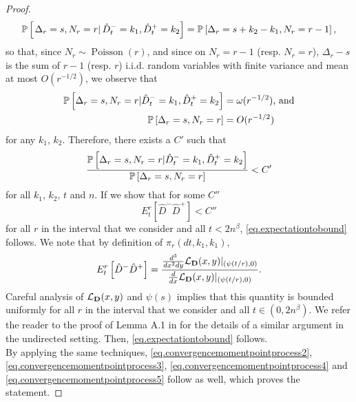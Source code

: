 \begin{proof}
$$\P\left[\left. \Delta_r=s, N_r=r \right| \hat{D}^-_t=k_1,\hat{D}^+_t=k_2\right]=\P\left[ \Delta_r=s+k_2-k_1, N_r=r-1 \right],$$
so that, since $N_r\sim \operatorname{Poisson}(r)$, and since on $N_r=r-1$ (resp. $N_r=r$),  $\Delta_r-s$ is the sum of $r-1$ (resp. $r$) i.i.d. random variables with finite variance and mean at most $O(r^{-1/2})$, we observe that 
\begin{align*}
    \P\left[ \Delta_r=s, N_r=r | \hat{D}^-_t=k_1,\hat{D}^+_t=k_2\right]&=\omega(r^{-1/2})\text{, and}\\
    \P\left[ \Delta_r=s, N_r=r \right]&=O(r^{-1/2})
\end{align*} for any $k_1$, $k_2$. Therefore, there exists a $C'$ such that
$$\frac{\P\left[ \Delta_r=s, N_r=r | \hat{D}^-_t=k_1,\hat{D}^+_t=k_2\right]}{\P\left[ \Delta_r=s, N_r=r\right]}<C'$$
for all $k_1$, $k_2$, $t$ and $n$. If we show that for some $C''$ $${E}^r_t\left[\hat{D}^-\hat{D}^+\right]<C''$$ for all $r$ in the interval that we consider and all $t<2n^\beta$,  \eqref{eq.expectationtobound} follows. We note that by definition of $\pi_r(dt,k_1,k_1)$, 
$${E}^r_t\left[\hat{D}^-\hat{D}^+\right]=\frac{\frac{d^3}{dx^2 dy}\cL_{\mathbf{D}}(x,y)|_{(\psi(t/r),0)}}{\frac{d}{dx}\cL_{\mathbf{D}}(x,y)|_{(\psi(t/r),0)}}.$$
Careful analysis of $\cL_{\mathbf{D}}(x,y)$ and $\psi(s)$ implies that this quantity is bounded uniformly for all $r$ in the interval that we consider and all $t\in(0,2n^\beta)$. We refer the reader to the proof of Lemma A.1 in \cite{josephComponentSizesCritical2014} for the details of a similar argument in the undirected setting. Then, \eqref{eq.expectationtobound} follows. \\
By applying the same techniques, \eqref{eq.convergencemomentpointprocess2}, \eqref{eq.convergencemomentpointprocess3}, \eqref{eq.convergencemomentpointprocess4} and  \eqref{eq.convergencemomentpointprocess5} follow as well, which proves the statement.


\end{proof}
